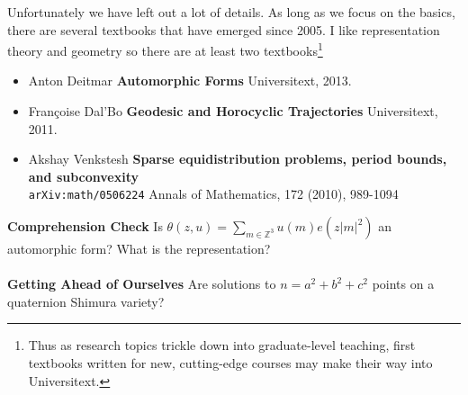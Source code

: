 \documentclass[12pt]{article}
\begin{document}
Unfortunately we have left out a lot of details.  As long as we focus on the basics, there are several textbooks that have emerged since 2005.  I like representation theory and geometry so there are at least two textbooks\footnote{Thus as research topics trickle down into graduate-level teaching, first textbooks written for new, cutting-edge courses may make their way into Universitext.}
\begin{itemize}
\item Anton Deitmar \textbf{Automorphic Forms} Universitext, 2013.
\item Françoise Dal'Bo  \textbf{Geodesic and Horocyclic Trajectories} Universitext, 2011.
\item Akshay Venkstesh \textbf{Sparse equidistribution problems, period bounds, and subconvexity} \\ \texttt{arXiv:math/0506224} Annals of Mathematics, 172 (2010), 989-1094
\end{itemize}

\newpage

\noindent \textbf{Comprehension Check} Is $\displaystyle \theta(z, u)= \sum_{m \in \mathbb{Z}^3} u(m) e(z|m|^2)$ an automorphic form?  What is the representation? \\ \\
\textbf{Getting Ahead of Ourselves}  Are solutions to $n = a^2 + b^2 + c^2$ points on a quaternion Shimura variety?
\end{document}
